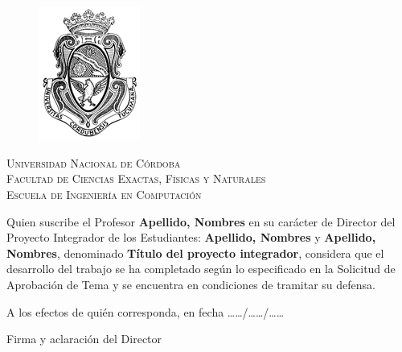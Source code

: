 \chapter*{}
\begin{center}
	
	\begin{figure}[h]
		\begin{center}
			\includegraphics[scale=0.8]{logo_unc.png}
		\end{center}
	\end{figure}
	\vspace{0.25em}
	
	\textsc{\LARGE Universidad Nacional de Córdoba}\\[0.3cm] %
	\textsc{\large Facultad de Ciencias Exactas, Físicas y Naturales}\\[0.3cm] %
	\textsc{\large Escuela de Ingeniería en Computación}\\[0.75cm] %
\end{center}

Quien suscribe el Profesor \textbf{Apellido, Nombres} en su carácter de Director del Proyecto Integrador de los 
Estudiantes: \textbf{Apellido, Nombres} y \textbf{Apellido, Nombres}, denominado \textbf{Título del proyecto integrador}, 
considera que el desarrollo del trabajo se ha completado según lo especificado en la Solicitud de Aprobación de Tema y 
se encuentra en condiciones de tramitar su defensa.

\begin{flushright}

    \vspace{1cm}

    A los efectos de quién corresponda, en fecha ……/……/……

    \vspace{4cm}

    Firma y aclaración del Director

\end{flushright}

\clearpage{\thispagestyle{empty}\cleardoublepage}       %